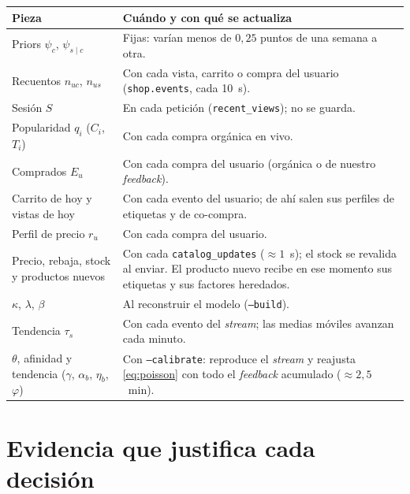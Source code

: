 \documentclass[11pt,a4paper]{article}
\newcommand{\cod}[1]{\texttt{#1}}
\begin{document}
\begin{center}
\begin{tabular}{p{6.2cm}p{8.6cm}}
\toprule
Pieza & Cuándo y con qué se actualiza\\
\midrule
Priors $\psi_c$, $\psi_{s\mid c}$ & Fijas: varían menos de $0{,}25$ puntos de una semana a otra.\\
Recuentos $n_{uc}$, $n_{us}$ & Con cada vista, carrito o compra del usuario (\cod{shop.events}, cada 10~s).\\
Sesión $S$ & En cada petición (\cod{recent\_views}); no se guarda.\\
Popularidad $q_i$ ($C_i$, $T_i$) & Con cada compra orgánica en vivo.\\
Comprados $E_u$ & Con cada compra del usuario (orgánica o de nuestro \emph{feedback}).\\
Carrito de hoy y vistas de hoy & Con cada evento del usuario; de ahí salen sus perfiles de etiquetas y de co-compra.\\
Perfil de precio $r_u$ & Con cada compra del usuario.\\
Precio, rebaja, stock y productos nuevos & Con cada \cod{catalog\_updates} ($\approx 1$~s); el stock se revalida al enviar. El producto nuevo recibe en ese momento sus etiquetas y sus factores heredados.\\
$\kappa$, $\lambda$, $\beta$ & Al reconstruir el modelo (\cod{--build}).\\
Tendencia $\tau_s$ & Con cada evento del \emph{stream}; las medias móviles avanzan cada minuto.\\
$\theta$, afinidad y tendencia ($\gamma$, $\alpha_b$, $\eta_b$, $\varphi$) & Con \cod{--calibrate}: reproduce el \emph{stream} y reajusta
\eqref{eq:poisson} con todo el \emph{feedback} acumulado ($\approx 2{,}5$~min).\\
\bottomrule
\end{tabular}
\end{center}

\section{Evidencia que justifica cada decisión}
\end{document}

